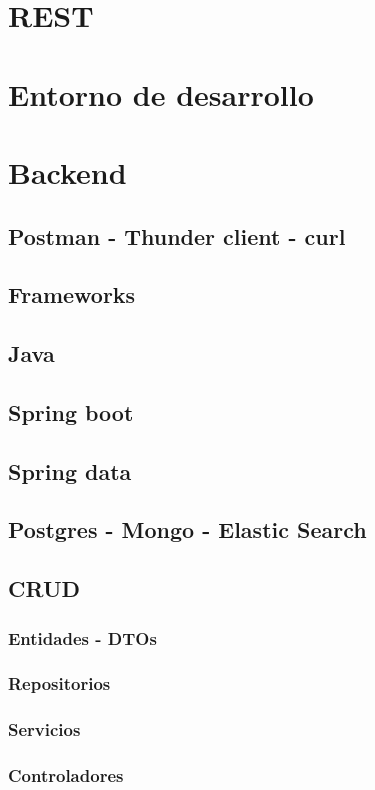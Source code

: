 \section{REST}

\section{Entorno de desarrollo}

\section{Backend}
\subsection{Postman - Thunder client - curl}
\subsection{Frameworks}
\subsection{Java}
\subsection{Spring boot}
\subsection{Spring data}
\subsection{Postgres - Mongo - Elastic Search}
\subsection{CRUD}
\subsubsection{Entidades - DTOs}
\subsubsection{Repositorios}
\subsubsection{Servicios}
\subsubsection{Controladores}

